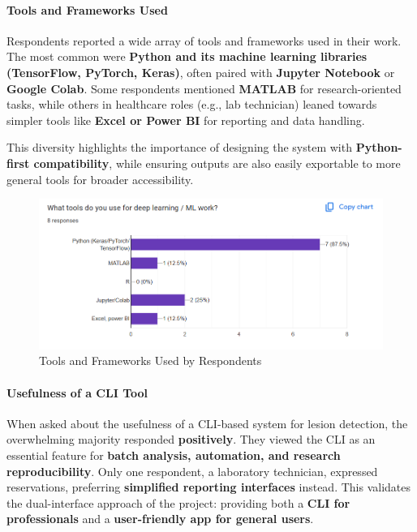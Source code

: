 \documentclass[
  12pt,
  oneside]{article}
\begin{document}
\paragraph{Tools and Frameworks Used}\label{tools-and-frameworks-used}

Respondents reported a wide array of tools and frameworks used in their
work. The most common were \textbf{Python and its machine learning
libraries (TensorFlow, PyTorch, Keras)}, often paired with
\textbf{Jupyter Notebook} or \textbf{Google Colab}. Some respondents
mentioned \textbf{MATLAB} for research-oriented tasks, while others in
healthcare roles (e.g., lab technician) leaned towards simpler tools
like \textbf{Excel or Power BI} for reporting and data handling.

This diversity highlights the importance of designing the system with
\textbf{Python-first compatibility}, while ensuring outputs are also
easily exportable to more general tools for broader accessibility.

\newpage

\begin{figure}

{\centering \includegraphics[width=1\linewidth]{technical-user-chart3} 

}

\caption{Tools and Frameworks Used by Respondents}\label{fig:unnamed-chunk-11}
\end{figure}

\paragraph{Usefulness of a CLI Tool}\label{usefulness-of-a-cli-tool}

When asked about the usefulness of a CLI-based system for lesion
detection, the overwhelming majority responded \textbf{positively}. They
viewed the CLI as an essential feature for \textbf{batch analysis,
automation, and research reproducibility}. Only one respondent, a
laboratory technician, expressed reservations, preferring
\textbf{simplified reporting interfaces} instead. This validates the
dual-interface approach of the project: providing both a \textbf{CLI for
professionals} and a \textbf{user-friendly app for general users}.
\end{document}
